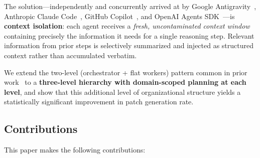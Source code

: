 \documentclass[letterpaper]{aaai25}  %
\begin{document}
The solution---independently and concurrently arrived at by Google
Antigravity~\cite{google2024antigravity}, Anthropic Claude
Code~\cite{anthropic2024claudecode}, GitHub
Copilot~\cite{github2024copilot}, and OpenAI Agents
SDK~\cite{openai2024agents}---is \textbf{context isolation}: each agent
receives a \emph{fresh, uncontaminated context window} containing precisely
the information it needs for a single reasoning step. Relevant information
from prior steps is selectively summarized and injected as structured context
rather than accumulated verbatim.

We extend the two-level (orchestrator + flat workers) pattern common in
prior work~\cite{wu2023autogen,moura2023crewai} to a \textbf{three-level
hierarchy with domain-scoped planning at each level}, and show that this
additional level of organizational structure yields a statistically
significant improvement in patch generation rate.

\subsection{Contributions}
\label{sec:intro:contributions}

This paper makes the following contributions:
\end{document}
